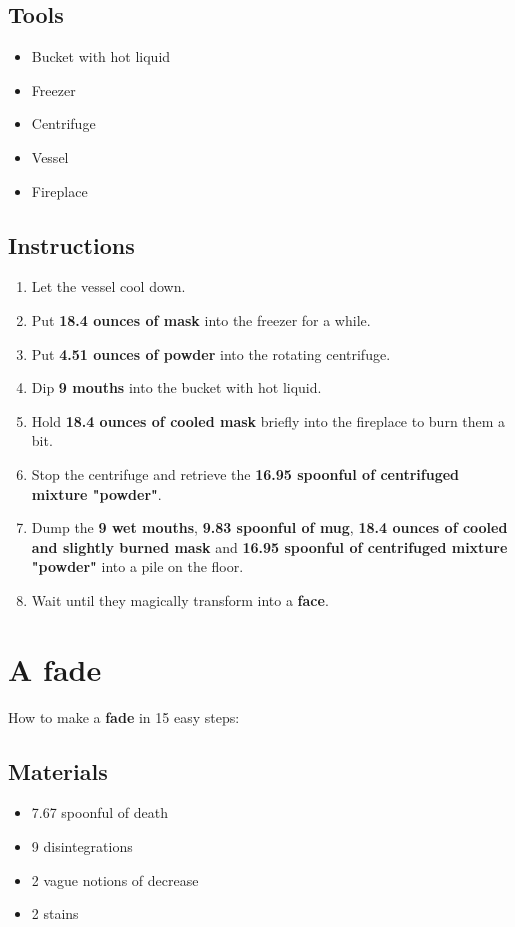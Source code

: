 \documentclass{article}
\begin{document}
\subsection{Tools}\begin{itemize}
\item 
Bucket with hot liquid
\item 
Freezer
\item 
Centrifuge
\item 
Vessel
\item 
Fireplace
\end{itemize}
\subsection{Instructions}\begin{enumerate}
\item 
Let the vessel cool down.
\item 
Put \textbf{18.4 ounces of mask} into the freezer for a while.
\item 
Put \textbf{4.51 ounces of powder} into the rotating centrifuge.
\item 
Dip \textbf{9 mouths} into the bucket with hot liquid.
\item 
Hold \textbf{18.4 ounces of cooled mask} briefly into the fireplace to burn them a bit.
\item 
Stop the centrifuge and retrieve the \textbf{16.95 spoonful of centrifuged mixture "powder"}.
\item 
Dump the \textbf{9 wet mouths}, \textbf{9.83 spoonful of mug}, \textbf{18.4 ounces of cooled and slightly burned mask} and \textbf{16.95 spoonful of centrifuged mixture "powder"} into a pile on the floor.
\item 
Wait until they magically transform into a \textbf{face}.
\end{enumerate}
\newpage
\section{A fade}How to make a \textbf{fade} in 15 easy steps:

\subsection{Materials}\begin{itemize}
\item 
7.67 spoonful of death
\item 
9 disintegrations
\item 
2 vague notions of decrease
\item 
2 stains
\end{itemize}
\end{document}

